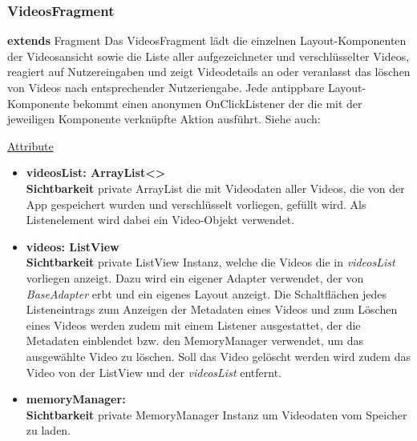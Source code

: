 \subsubsection{VideosFragment} \label{app:klasse:VideosFragment}
\textbf{extends} Fragment \newline
Das VideosFragment lädt die einzelnen Layout-Komponenten der Videosansicht sowie die Liste aller aufgezeichneter und verschlüsselter Videos, reagiert auf Nutzereingaben und zeigt Videodetails an oder veranlasst das löschen von Videos nach entsprechender Nutzeriengabe. Jede antippbare Layout-Komponente bekommt einen anonymen OnClickListener der die mit der jeweiligen Komponente verknüpfte Aktion ausführt.
\newline
Siehe auch:  \newline

\underline{Attribute}
\begin{itemize}
\itemsep0pt
\item \textbf{videosList: ArrayList<> } \hfill\\ 
\textbf{Sichtbarkeit} private \newline
ArrayList die mit Videodaten aller Videos, die von der App gespeichert wurden und verschlüsselt vorliegen, gefüllt wird. Als Listenelement wird dabei ein Video-Objekt verwendet.

\item \textbf{videos: ListView} \hfill\\ 
\textbf{Sichtbarkeit} private \newline
ListView Instanz, welche die Videos die in \textit{videosList} vorliegen anzeigt. Dazu wird ein eigener Adapter verwendet, der von \textit{BaseAdapter} erbt und ein eigenes Layout anzeigt. Die Schaltflächen jedes Listeneintrags zum Anzeigen der Metadaten eines Videos und zum Löschen eines Videos werden zudem mit einem Listener ausgestattet, der die Metadaten einblendet bzw. den MemoryManager verwendet, um das ausgewählte Video zu löschen. Soll das Video gelöscht werden wird zudem das Video von der ListView und der \textit{videosList} entfernt.

\item \textbf{memoryManager: } \hfill\\ 
\textbf{Sichtbarkeit} private \newline
MemoryManager Instanz um Videodaten vom Speicher zu laden.

\end{itemize}

